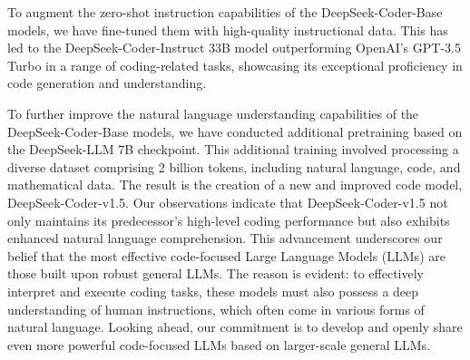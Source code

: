 To augment the zero-shot instruction capabilities of the DeepSeek-Coder-Base models, we have fine-tuned them with high-quality instructional data. This has led to the DeepSeek-Coder-Instruct 33B model outperforming OpenAI's GPT-3.5 Turbo in a range of coding-related tasks, showcasing its exceptional proficiency in code generation and understanding. 

To further improve the natural language understanding capabilities of the DeepSeek-Coder-Base models, we have conducted additional pretraining based on the DeepSeek-LLM 7B checkpoint. This additional training involved processing a diverse dataset comprising 2 billion tokens, including natural language, code, and mathematical data. The result is the creation of a new and improved code model, DeepSeek-Coder-v1.5. Our observations indicate that DeepSeek-Coder-v1.5 not only maintains its predecessor's high-level coding performance but also exhibits enhanced natural language comprehension. This advancement underscores our belief that the most effective code-focused Large Language Models (LLMs) are those built upon robust general LLMs. The reason is evident: to effectively interpret and execute coding tasks, these models must also possess a deep understanding of human instructions, which often come in various forms of natural language. Looking ahead, our commitment is to develop and openly share even more powerful code-focused LLMs based on larger-scale general LLMs.


